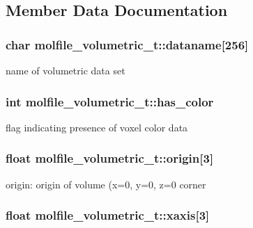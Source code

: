 \subsection{\-Member \-Data \-Documentation}
\hypertarget{structmolfile__volumetric__t_aa4bfbb00758b1ed2f76504c90444e8ef}{
\subsubsection[{dataname}]{\setlength{\rightskip}{0pt plus 5cm}char {\bf molfile\-\_\-volumetric\-\_\-t\-::dataname}\mbox{[}256\mbox{]}}}\label{structmolfile__volumetric__t_aa4bfbb00758b1ed2f76504c90444e8ef}
name of volumetric data set \hypertarget{structmolfile__volumetric__t_ab8e2959cd215b5a0d899c4282f32697f}{
\subsubsection[{has\-\_\-color}]{\setlength{\rightskip}{0pt plus 5cm}int {\bf molfile\-\_\-volumetric\-\_\-t\-::has\-\_\-color}}}\label{structmolfile__volumetric__t_ab8e2959cd215b5a0d899c4282f32697f}
flag indicating presence of voxel color data \hypertarget{structmolfile__volumetric__t_a1801318b10612f857e838b32f706fbcc}{
\subsubsection[{origin}]{\setlength{\rightskip}{0pt plus 5cm}float {\bf molfile\-\_\-volumetric\-\_\-t\-::origin}\mbox{[}3\mbox{]}}}\label{structmolfile__volumetric__t_a1801318b10612f857e838b32f706fbcc}
origin\-: origin of volume (x=0, y=0, z=0 corner \hypertarget{structmolfile__volumetric__t_aa55eac0680e84bc17e7ae7c68999d834}{
\subsubsection[{xaxis}]{\setlength{\rightskip}{0pt plus 5cm}float {\bf molfile\-\_\-volumetric\-\_\-t\-::xaxis}\mbox{[}3\mbox{]}}}\label{structmolfile__volumetric__t_aa55eac0680e84bc17e7ae7c68999d834}
